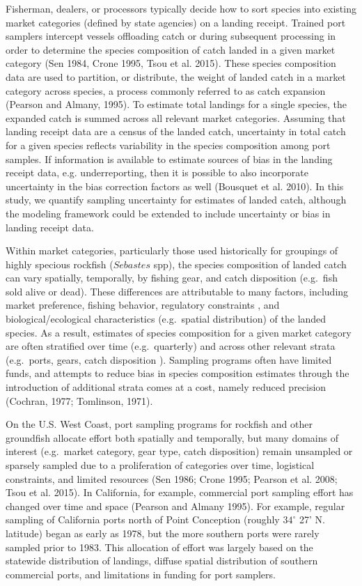 \documentclass[12pt]{article}
\begin{document}
Fisherman, dealers, or processors typically decide how to sort species
into existing market categories (defined by state agencies) on a landing 
receipt. Trained port samplers intercept vessels offloading catch or during 
subsequent processing in order to determine the species composition of catch 
landed in a given market category (Sen 1984, Crone 1995, Tsou et al. 2015). 
These species composition data are used to partition, or distribute, the 
weight of landed catch in a market category across species, a process 
commonly referred to as catch expansion (Pearson and Almany, 1995). To 
estimate total landings for a single species, the expanded catch is summed 
across all relevant market categories. Assuming that landing receipt data 
are a census of the landed catch, uncertainty in total catch for a 
given species reflects variability in the species composition among 
port samples. If information is available to estimate sources of bias in 
the landing receipt data, e.g. underreporting, then it is possible to 
also incorporate uncertainty in the bias correction factors as well 
(Bousquet et al. 2010). In this study, we quantify sampling uncertainty 
for estimates of landed catch, although the modeling framework could be
extended to include uncertainty or bias in landing receipt data.

Within market categories, particularly those used historically for
groupings of highly specious rockfish ($Sebastes$ spp), the species
composition of landed catch can vary spatially, temporally, by fishing
gear, and catch disposition (e.g.~fish sold alive or dead). These
differences are attributable to many factors, including market
preference, fishing behavior, regulatory constraints , and
biological/ecological characteristics (e.g.~spatial distribution) of the
landed species. As a result, estimates of species composition for a
given market category are often stratified over time (e.g.~quarterly)
and across other relevant strata (e.g.~ports, gears, catch disposition
). Sampling programs often have limited funds, and attempts to reduce
bias in species composition estimates through the introduction of
additional strata comes at a cost, namely reduced precision (Cochran,
1977; Tomlinson, 1971).

On the U.S. West Coast, port sampling programs for rockfish and other
groundfish allocate effort both spatially and temporally, but many
domains of interest (e.g.~market category, gear type, catch disposition)
remain unsampled or sparsely sampled due to a proliferation of
categories over time, logistical constraints, and limited resources (Sen
1986; Crone 1995; Pearson et al. 2008; Tsou et al. 2015). In California,
for example, commercial port sampling effort has changed over time and
space (Pearson and Almany 1995). For example, regular sampling of
California ports north of Point Conception (roughly \(34^{\circ}\) 27'
N. latitude) began as early as 1978, but the more southern ports were
rarely sampled prior to 1983. This allocation of effort was largely
based on the statewide distribution of landings, diffuse spatial
distribution of southern commercial ports, and limitations in funding
for port samplers.
\end{document}
